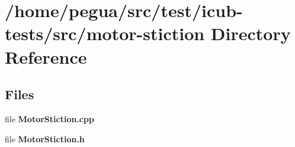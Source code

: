 \section{/home/pegua/src/test/icub-\/tests/src/motor-\/stiction Directory Reference}
\label{dir_3b1318bac6af3327e49b6f2c90562c86}
\subsection*{Files}
\begin{DoxyCompactItemize}
\item 
file {\bfseries Motor\-Stiction.\-cpp}
\item 
file {\bfseries Motor\-Stiction.\-h}
\end{DoxyCompactItemize}
